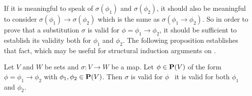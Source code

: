 If it is meaningful to speak of $\sigma(\phi_{1})$ and
$\sigma(\phi_{2})$, it should also be meaningful to consider
$\sigma(\phi_{1})\to\sigma(\phi_{2})$ which is the same as
$\sigma(\phi_{1}\to\phi_{2})$. So in order to prove that a
substitution $\sigma$ is valid for $\phi=\phi_{1}\to\phi_{2}$, it
should be sufficient to establish its validity both for $\phi_{1}$
and $\phi_{2}$. The following proposition establishes that fact,
which may be useful for structural induction arguments on \pv.
\begin{prop}\label{logic:prop:FOPL:valid:recursion:imp}
Let $V$ and $W$ be sets and $\sigma:V\to W$ be a map. Let
$\phi\in\mbox{${\bf P}(V)$}$ of the form $\phi=\phi_{1}\to\phi_{2}$ with
$\phi_{1},\phi_{2}\in\mbox{${\bf P}(V)$}$. Then $\sigma$ is valid for $\phi$ \ifand\
it is valid for both $\phi_{1}$ and $\phi_{2}$.
\end{prop}
